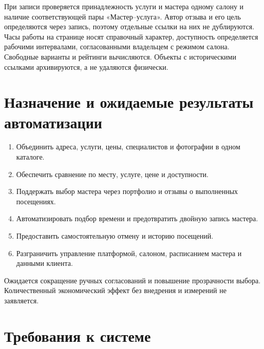 При записи проверяется принадлежность услуги и мастера одному салону и наличие соответствующей пары «Мастер--услуга». Автор отзыва и его цель определяются через запись, поэтому отдельные ссылки на них не дублируются. Часы работы на странице носят справочный характер, доступность определяется рабочими интервалами, согласованными владельцем с режимом салона. Свободные варианты и рейтинги вычисляются. Объекты с историческими ссылками архивируются, а не удаляются физически.

\section{Назначение и ожидаемые результаты автоматизации}
\begin{enumerate}
\item Объединить адреса, услуги, цены, специалистов и фотографии в одном каталоге.
\item Обеспечить сравнение по месту, услуге, цене и доступности.
\item Поддержать выбор мастера через портфолио и отзывы о выполненных посещениях.
\item Автоматизировать подбор времени и предотвратить двойную запись мастера.
\item Предоставить самостоятельную отмену и историю посещений.
\item Разграничить управление платформой, салоном, расписанием мастера и данными клиента.
\end{enumerate}
Ожидается сокращение ручных согласований и повышение прозрачности выбора. Количественный экономический эффект без внедрения и измерений не заявляется.


\section{Требования к системе}
